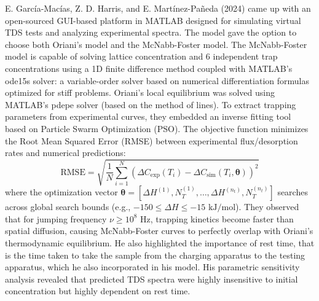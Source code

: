 \documentclass[a4paper,12pt,oneside]{report}
\begin{document}
E. García-Macías, Z. D. Harris, and E. Martínez-Pañeda (2024) came up with an open-sourced GUI-based platform in MATLAB designed for simulating virtual TDS tests and analyzing experimental spectra. The model gave the option to choose both Oriani's model and the McNabb-Foster model. The McNabb-Foster model is capable of solving lattice concentration and 6 independent trap concentrations using a 1D finite difference method coupled with MATLAB's ode15s solver: a variable-order solver based on numerical differentiation formulas optimized for stiff problems. Oriani's local equilibrium was solved using MATLAB's pdepe solver (based on the method of lines). To extract trapping parameters from experimental curves, they embedded an inverse fitting tool based on Particle Swarm Optimization (PSO). The objective function minimizes the Root Mean Squared Error (RMSE) between experimental flux/desorption rates and numerical predictions:
\begin{equation}
    \text{RMSE} = \sqrt{\frac{1}{N} \sum_{i=1}^{N} \left( \Delta C_{\text{exp}}(T_i) - \Delta C_{\text{sim}}(T_i, \mathbf{\theta}) \right)^2}
\end{equation}
where the optimization vector $\mathbf{\theta} = [\Delta H^{(1)}, N_T^{(1)}, \dots, \Delta H^{(n_t)}, N_T^{(n_t)}]$ searches across global search bounds (e.g., $-150 \le \Delta H \le -15 \text{ kJ/mol}$). They observed that for jumping frequency $\nu \ge 10^8\text{ Hz}$, trapping kinetics become faster than spatial diffusion, causing McNabb-Foster curves to perfectly overlap with Oriani's thermodynamic equilibrium. He also highlighted the importance of rest time, that is the time taken to take the sample from the charging apparatus to the testing apparatus, which he also incorporated in his model. His parametric sensitivity analysis revealed that predicted TDS spectra were highly insensitive to initial concentration but highly dependent on rest time.
\end{document}
